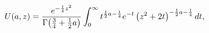\[\mathop{U\/}\nolimits\!\left(a,z\right)=\frac{e^{-\frac{1}{4}z^{2}}}{\mathop{%
\Gamma\/}\nolimits\!\left(\frac{3}{4}+\frac{1}{2}a\right)}\*\int_{0}^{\infty}t%
^{\frac{1}{2}a-\frac{1}{4}}e^{-t}\left(z^{2}+2t\right)^{-\frac{1}{2}a-\frac{1}%
{4}}dt,\]